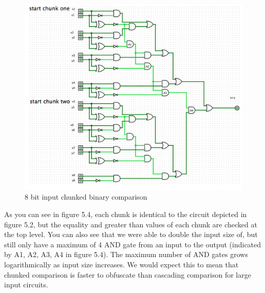 \documentclass[12pt,twoside]{reedthesis}
\begin{document}
 
 \begin{figure}[htbp]
 	\centering
	\includegraphics[scale = .6]{ccomp4_8}
	\caption{8 bit input chunked binary comparison}
	\label{subd}
 \end{figure}
 
 \par As you can see in figure 5.4, each chunk is identical to the circuit depicted in figure 5.2, but the equality and greater than values of each chunk are checked at the top level. You can also see that we were able to double the input size of, but still only have a maximum of 4 AND gate from an input to the output (indicated by A1, A2, A3, A4 in figure 5.4). The maximum number of AND gates grows logarithmically as input size increases. We would expect this to mean that chunked comparison is faster to obfuscate than cascading comparison for large input circuits.   
 
 
\end{document}

